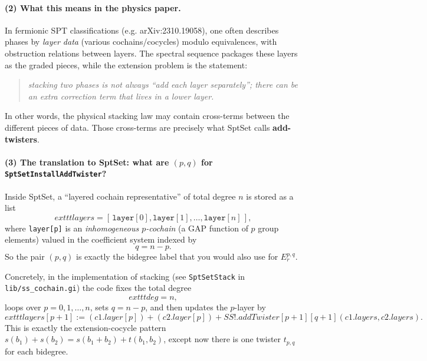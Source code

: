\documentclass{SciPost}
\begin{document}
\paragraph{(2) What this means in the physics paper.}
In fermionic SPT classifications (e.g. arXiv:2310.19058), one often describes phases by \emph{layer data} (various cochains/cocycles) modulo equivalences, with obstruction relations between layers.
The spectral sequence packages these layers as the graded pieces, while the extension problem is the statement:
\begin{quote}
\emph{stacking two phases is not always ``add each layer separately''; there can be an extra correction term that lives in a lower layer.}
\end{quote}
In other words, the physical stacking law may contain cross-terms between the different pieces of data.
Those cross-terms are precisely what SptSet calls \textbf{add-twisters}.

\paragraph{(3) The translation to SptSet: what are $(p,q)$ for \texttt{SptSetInstallAddTwister}?}
Inside SptSet, a ``layered cochain representative'' of total degree $n$ is stored as a list
\begin{equation}
	exttt{layers} = [\,\texttt{layer}[0],\texttt{layer}[1],\dots,\texttt{layer}[n]\,],
\end{equation}
where \texttt{layer[p]} is an \emph{inhomogeneous $p$-cochain} (a GAP function of $p$ group elements) valued in the coefficient system indexed by
\begin{equation}
q = n-p.
\end{equation}
So the pair $(p,q)$ is exactly the bidegree label that you would also use for $E_r^{p,q}$.

Concretely, in the implementation of stacking (see \texttt{SptSetStack} in \texttt{lib/ss\_cochain.gi}) the code fixes the total degree
\begin{equation}
	exttt{deg} = n,
\end{equation}
loops over $p=0,1,\dots,n$, sets $q=n-p$, and then updates the $p$-layer by
\begin{equation}
	exttt{layers[p+1] := (c1.layer[p]) + (c2.layer[p]) + SS!.addTwister[p+1][q+1](c1.layers,c2.layers)}.
\end{equation}
This is exactly the extension-cocycle pattern $s(b_1)+s(b_2)=s(b_1+b_2)+t(b_1,b_2)$, except now there is one twister $t_{p,q}$ for each bidegree.
\end{document}
